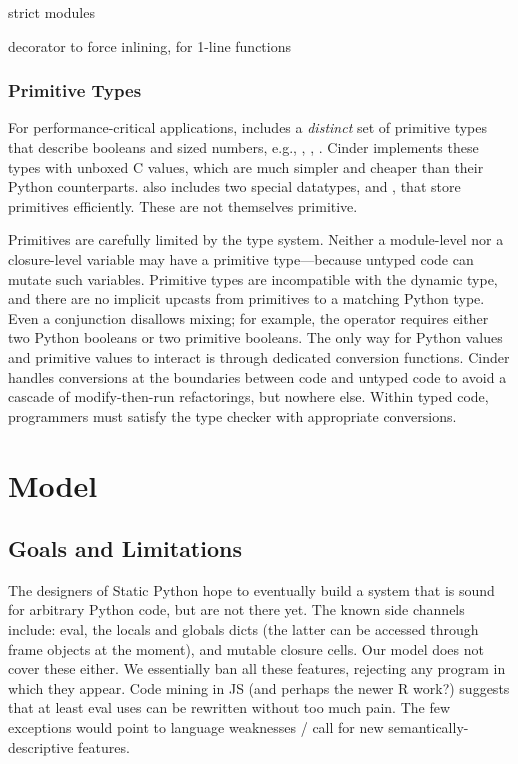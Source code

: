 \documentclass[a4paper,english,cleveref,autoref,thm-restate,anonymous,]{lipics-v2021}
\begin{document}
strict modules

decorator to force inlining, for 1-line functions


\subsubsection{Primitive Types}

For performance-critical applications, \SP{} includes a \emph{distinct} set of primitive types
that describe booleans and sized numbers, e.g., , , .
Cinder implements these types with unboxed C values, which are much simpler and cheaper
than their Python counterparts.
\SP{} also includes two special datatypes,  and , that store primitives efficiently.
These are not themselves primitive.

Primitives are carefully limited by the type system.
Neither a module-level nor a closure-level variable may have a primitive
type---because untyped code can mutate such variables.
Primitive types are incompatible with the dynamic type,
and there are no implicit upcasts from primitives
to a matching Python type.
Even a conjunction disallows mixing; for example, the  operator
requires either two Python booleans or two primitive booleans.
The only way for Python values and primitive values to interact
is through dedicated conversion functions.
Cinder handles conversions at the boundaries between \SP{} code
and untyped code to avoid a cascade of modify-then-run refactorings, but nowhere else.
Within typed code, programmers must satisfy the type checker with
appropriate conversions.





\section{Model}
\label{s:model}


\subsection{Goals and Limitations}

The designers of Static Python hope to eventually build a system that is sound for arbitrary Python code,
but are not there yet.
The known side channels include:
eval, the locals and globals dicts (the latter can be accessed through frame objects at the moment),
and mutable closure cells.
Our model does not cover these either.
We essentially ban all these features, rejecting any program in which they appear.
Code mining in JS (and perhaps the newer R work?) suggests that at least eval
uses can be rewritten without too much pain. The few exceptions would point
to language weaknesses / call for new semantically-descriptive features.
\end{document}
